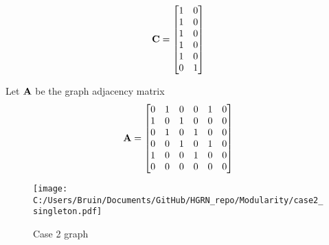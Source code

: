 \documentclass[a4paper,12pt]{article}
\begin{document}
	\[ {\bf C} = \begin{bmatrix}1 & 0 \\ 1 & 0 \\ 1 & 0 \\ 1 & 0 \\ 1 & 0 \\ 0 & 1 \\	\end{bmatrix}\] 
	
	Let $\bf A$ be the graph adjacency matrix
	\[ {\bf A} = \begin{bmatrix}
		0& 1& 0& 0& 1& 0 \\
		1& 0& 1& 0& 0& 0 \\
		0& 1& 0& 1& 0& 0 \\
		0& 0& 1& 0& 1& 0 \\
		1& 0& 0& 1& 0& 0 \\
		0& 0& 0& 0& 0& 0 \\
	\end{bmatrix}\] 
	
	
	\begin{figure}[H]
		\centering
		\caption{Case 2 graph}
		\texttt{[image: C:/Users/Bruin/Documents/GitHub/HGRN\_repo/Modularity/case2\_singleton.pdf]}
		\label{fig:case3}
	\end{figure}
	
	
	
	
	
	
	
	
	
	
	
	
	
	
	
	
	
	
	
	
	
	
	
	
	
	
	
	
	
	
	
	
	
	
	\clearpage
	\newpage
	
	
	
	
	
	
	
	
	
\end{document}
